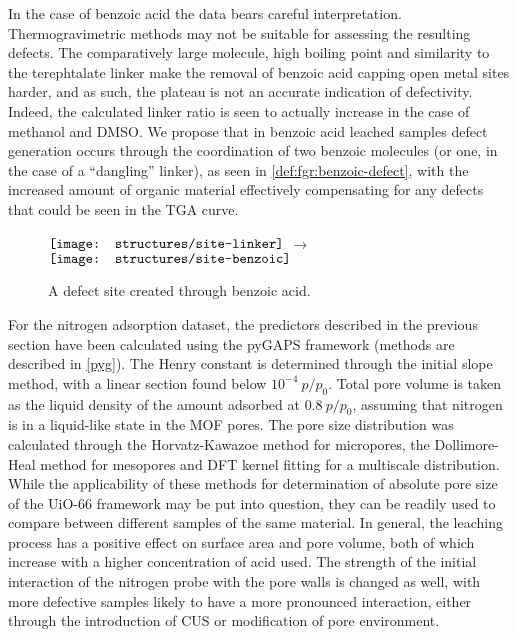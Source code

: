 In the case of benzoic acid the data bears careful interpretation. 
Thermogravimetric methods may not be suitable 
for assessing the resulting defects. The comparatively large molecule,
high boiling point and similarity to the terephtalate linker
make the removal of benzoic acid capping open metal sites harder, and
as such, the plateau is not an accurate indication of defectivity.
Indeed, the calculated linker ratio is seen to actually increase in 
the case of methanol and DMSO. We propose that in benzoic acid 
leached samples defect generation occurs through the coordination
of two benzoic molecules (or one, in the case of a ``dangling'' linker), 
as seen in \autoref{def:fgr:benzoic-defect},
with the increased amount of organic material effectively compensating
for any defects that could be seen in the TGA curve.

\begin{figure}[!htb]
    \centering
    \( \vcenter{\hbox{\texttt{[image: structures/site-linker]}}}\)%
    \( \longrightarrow \)%
    \(\vcenter{\hbox{\texttt{[image: structures/site-benzoic]}}}\)
    \caption{A defect site created through benzoic acid.}%
    \label{def:fgr:benzoic-defect}
\end{figure}

For the nitrogen adsorption dataset, the predictors described in the 
previous section have been calculated using the pyGAPS framework
(methods are described in \autoref{pyg}). The Henry constant is determined 
through the initial slope method, with a linear section found below 
\(10^{-4}~p/p_0\). Total pore volume is taken as the liquid density
of the amount adsorbed at \(0.8~p/p_0\), assuming that 
nitrogen is in a liquid-like state in the MOF pores. The pore
size distribution was calculated through the Horvatz-Kawazoe
method for micropores, the Dollimore-Heal method for mesopores
and DFT kernel fitting for a multiscale distribution. While 
the applicability of these methods for determination of absolute
pore size of the UiO-66 framework may be put into question, 
they can be readily used to compare between different samples
of the same material.
In general, the leaching process has a positive effect on 
surface area and pore volume, both of which increase 
with a higher concentration of acid used. The strength of 
the initial interaction of the nitrogen probe with the pore 
walls is changed as well, with more defective samples likely
to have a more pronounced interaction, either through the introduction
of CUS or modification of pore environment.

